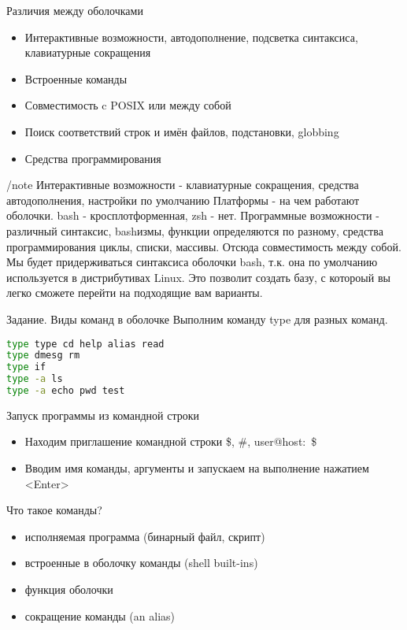 \begin{frame}[fragile]{Различия между оболочками}
  \begin{itemize}
    \item Интерактивные возможности,  автодополнение, подсветка синтаксиса, клавиатурные сокращения
    \item Встроенные команды 
    \item Совместимость c POSIX или между собой
    \item Поиск соответствий строк и имён файлов, подстановки, globbing
    \item Средства программирования
\end{itemize}
\end{frame}
/note {
Интерактивные возможности - клавиатурные сокращения, средства автодополнения, настройки по умолчанию
Платформы - на чем работают оболочки. bash - кросплотформенная, zsh - нет. 
Программные возможности - различный синтаксис, bashизмы, функции определяются
по разному, средства программирования циклы, списки, массивы. Отсюда
совместимость между собой. 
Мы будет придерживаться синтаксиса оболочки bash, т.к. она по умолчанию
используется в дистрибутивах Linux.  Это позволит создать базу, с
котороый вы легко сможете перейти на подходящие вам варианты. 
}

\begin{frame}[fragile]{Задание. Виды команд в оболочке}
Выполним команду type для разных команд.
\begin{lstlisting}[language=bash]
type type cd help alias read
type dmesg rm
type if
type -a ls
type -a echo pwd test
\end{lstlisting}
\end{frame}

\begin{frame}[fragile]{Запуск программы из командной строки}
  \begin{itemize}
    \item 
	Находим приглашение командной строки
	\$, \#, user@host:~\$
    \item
	Вводим имя команды, аргументы и запускаем на выполнение нажатием <Enter>
   \end{itemize}

	Что такое команды?
  \begin{itemize}
    \item исполняемая программа (бинарный файл, скрипт)
    \item встроенные в оболочку команды (shell built-ins)
    \item функция оболочки
    \item сокращение команды (an alias) 
  \end{itemize}
\end{frame}
